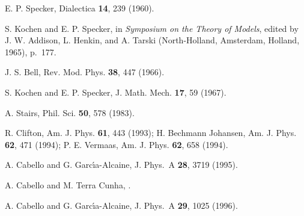 \documentclass[twocolumn,aps,pra,showpacs]{revtex4-1}
\begin{document}

\begin{thebibliography}{99}


 E. P. Specker,
 Dialectica {\bf 14}, 239 (1960).

 S. Kochen and E. P. Specker,
 in {\em Symposium on the Theory of Models},
 edited by J. W. Addison, L. Henkin, and A. Tarski
 (North-Holland, Amsterdam, Holland, 1965), p.~177.

 J. S. Bell,
 Rev. Mod. Phys. {\bf 38}, 447 (1966).

 S. Kochen and E. P. Specker,
 J. Math. Mech. {\bf 17}, 59 (1967).


 A. Stairs,
 Phil. Sci. {\bf 50}, 578 (1983).

 R. Clifton,
 Am. J. Phys. {\bf 61}, 443 (1993);
 H. Bechmann Johansen,
 Am. J. Phys. {\bf 62}, 471 (1994);
 P. E. Vermaas,
 Am. J. Phys. {\bf 62}, 658 (1994).

 A. Cabello and G. Garc\'{\i}a-Alcaine,
 J. Phys.~A {\bf 28}, 3719 (1995).

 A. Cabello and M. Terra Cunha,
 .


 A. Cabello and G. Garc\'{\i}a-Alcaine,
 J. Phys.~A {\bf 29}, 1025 (1996).


\end{thebibliography}
\end{document}
